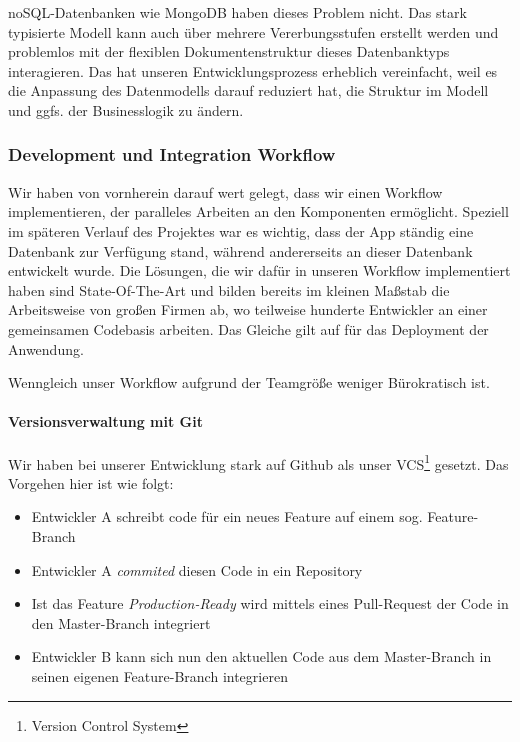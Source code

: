 \documentclass[titlepage, a4paper, 11pt]{scrartcl}
\begin{document}
          noSQL-Datenbanken wie MongoDB haben dieses Problem nicht. Das stark typisierte Modell kann auch über mehrere Vererbungsstufen erstellt werden und problemlos
          mit der flexiblen Dokumentenstruktur dieses Datenbanktyps interagieren. Das hat unseren Entwicklungsprozess erheblich vereinfacht, weil es die Anpassung 
          des Datenmodells darauf reduziert hat, die Struktur im Modell und ggfs. der Businesslogik zu ändern.

      \subsubsection{Development und Integration Workflow}

        Wir haben von vornherein darauf wert gelegt, dass wir einen Workflow implementieren, der paralleles Arbeiten an den Komponenten ermöglicht.
        Speziell im späteren Verlauf des Projektes war es wichtig, dass der App ständig eine Datenbank zur Verfügung stand, während andererseits an dieser Datenbank entwickelt wurde.
        Die Lösungen, die wir dafür in unseren Workflow implementiert haben sind State-Of-The-Art und bilden bereits im kleinen Maßstab die Arbeitsweise von großen Firmen
        ab, wo teilweise hunderte Entwickler an einer gemeinsamen Codebasis arbeiten. Das Gleiche gilt auf für das Deployment der Anwendung.

        Wenngleich unser Workflow aufgrund der Teamgröße weniger Bürokratisch ist.

        \paragraph{Versionsverwaltung mit Git}

          Wir haben bei unserer Entwicklung stark auf Github als unser VCS\footnote{Version Control System} gesetzt. Das Vorgehen hier ist wie folgt:

          \begin{itemize}
            \item Entwickler A schreibt code für ein neues Feature auf einem sog. Feature-Branch
            \item Entwickler A \textit{commited} diesen Code in ein Repository
            \item Ist das Feature \textit{Production-Ready} wird mittels eines Pull-Request der Code in den Master-Branch integriert
            \item Entwickler B kann sich nun den aktuellen Code aus dem Master-Branch in seinen eigenen Feature-Branch integrieren
          \end{itemize}
\end{document}
